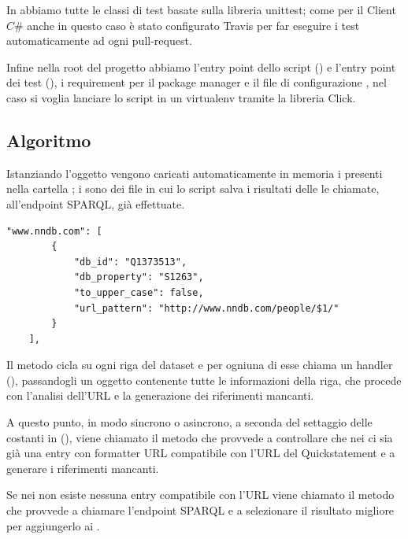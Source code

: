 In  abbiamo tutte le classi di test basate sulla libreria unittest\cite{unittest}; come per il Client $C\#$ anche in questo caso è stato configurato Travis per far eseguire i test 
automaticamente ad ogni pull-request. 

Infine nella root del progetto abbiamo l'entry point dello script () e l'entry point dei test (), i requirement per il package manager 
e il file di configurazione , nel caso si voglia lanciare lo script in un virtualenv\cite{virtualenv} tramite la libreria Click\cite{click}.

\subsection{Algoritmo}
Istanziando l'oggetto  vengono caricati automaticamente in memoria i  presenti nella cartella ; 
i  sono dei file  in cui lo script salva i risultati delle le chiamate, all'endpoint SPARQL, già effettuate.

\begin{lstlisting}[style=jsonStyle, caption=Some Code]
    "www.nndb.com": [
        {
            "db_id": "Q1373513", 
            "db_property": "S1263", 
            "to_upper_case": false, 
            "url_pattern": "http://www.nndb.com/people/$1/"
        }
    ], 
\end{lstlisting}

Il metodo  cicla su ogni riga del dataset e per ogniuna di esse chiama un handler 
(), passandogli un oggetto  contenente tutte le informazioni della riga, 
che procede con l'analisi dell'URL e la generazione dei riferimenti mancanti.

A questo punto, in modo sincrono o asincrono, a seconda del settaggio delle costanti in  (), 
viene chiamato il metodo  che provvede a controllare che nei  ci sia già una entry con formatter URL compatibile 
con l'URL del Quickstatement e a generare i riferimenti mancanti.

Se nei  non esiste nessuna entry compatibile con l'URL viene chiamato il metodo  che provvede a chiamare l'endpoint SPARQL 
e a selezionare il risultato migliore per aggiungerlo ai . 


